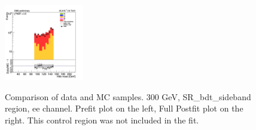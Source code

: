 \begin{figure}[tbp]
\begin{center}
    \includegraphics[width=0.31\textwidth]{figures/ee_300_april18/ee_300_good_SR_bdt_sideBand_april18/hmass1_ee_SR_FullPostfit_plot_apr18.png}\\
    \caption{Comparison of data and MC samples. 300 GeV, SR\_bdt\_sideband region, ee channel. Prefit plot on the left,           Full Postfit plot on the right. This control region was not included in the fit.}
    \label{fig:MCcomparisons_ee_low_SR_bdt_sideband}
  \end{center}
\end{figure}

